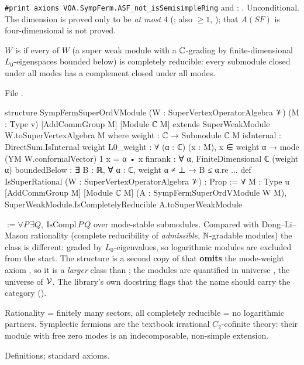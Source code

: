 \begin{status}
\texttt{\#print axioms VOA.SympFerm.ASF\_not\_isSemisimpleRing} and
: . Unconditional. The dimension is proved only to be \emph{at most} $4$ (; also
$\ge1$, ); that $A(SF)$ is four-dimensional is not proved.
\end{status}

\begin{definition}\label{l17:def:superrat}
$W$ is  if every  of $W$ (a super weak module with
a ${\mathbb{C}}$-grading by finite-dimensional $L_0$-eigenspaces bounded below) is completely reducible: every
submodule closed under all modes has a complement closed under all modes.
\end{definition}
\noindent File .
\begin{leancode}
structure SympFermSuperOrdVModule (W : SuperVertexOperatorAlgebra 𝒱) (M : Type v)
    [AddCommGroup M] [Module ℂ M] extends SuperWeakModule W.toSuperVertexAlgebra M where
  weight : ℂ → Submodule ℂ M
  isInternal : DirectSum.IsInternal weight
  L0_weight : ∀ (α : ℂ) (x : M), x ∈ weight α → mode (YM W.conformalVector) 1 x = α • x
  finrank : ∀ α, FiniteDimensional ℂ (weight α)
  boundedBelow : ∃ B : ℝ, ∀ α : ℂ, weight α ≠ ⊥ → B ≤ α.re
...
def IsSuperRational (W : SuperVertexOperatorAlgebra 𝒱) : Prop :=
  ∀ {M : Type u} [AddCommGroup M] [Module ℂ M] (A : SympFermSuperOrdVModule W M),
    SuperWeakModule.IsCompletelyReducible A.toSuperWeakModule
\end{leancode}
\begin{dictionary}
 $:=\forall P\,\exists Q,\ \mathrm{IsCompl}\,P\,Q$ over mode-stable
submodules. Compared with Dong--Li--Mason rationality (complete reducibility of \emph{admissible},
${\mathbb{N}}$-gradable modules) the class is different: graded by $L_0$-eigenvalues, so logarithmic modules
are excluded from the start. The structure is a second copy of  that
\textbf{omits} the mode-weight axiom , so it is a \emph{larger} class than
; the modules are quantified in universe , the universe of $\mathcal{V}$.
The library's own docstring flags that the name should carry the category ().
\end{dictionary}
\begin{physics}
Rationality = finitely many sectors, all completely reducible = no logarithmic partners. Symplectic
fermions are the textbook irrational $C_2$-cofinite theory: their module with free zero modes is an
indecomposable, non-simple extension.
\end{physics}
\begin{status}
Definitions; standard axioms.
\end{status}


